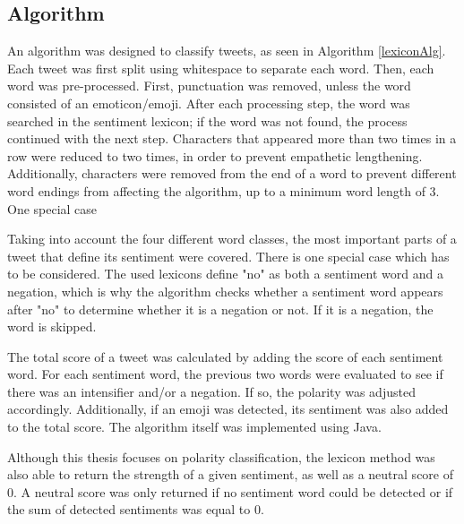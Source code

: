 \subsection{Algorithm}

An algorithm was designed to classify tweets, as seen in Algorithm \ref{lexiconAlg}. Each tweet was first split using whitespace to separate each word. Then, each word was pre-processed. First, punctuation was removed, unless the word consisted of an emoticon/emoji. After each processing step, the word was searched in the sentiment lexicon; if the word was not found, the process continued with the next step. Characters that appeared more than two times in a row were reduced to two times, in order to prevent empathetic lengthening. Additionally, characters were removed from the end of a word to prevent different word endings from affecting the algorithm, up to a minimum word length of 3. One special case

Taking into account the four different word classes, the most important parts of a tweet that define its sentiment were covered. There is one special case which has to be considered. The used lexicons define "no" as both a sentiment word and a negation, which is why the algorithm checks whether a sentiment word appears after "no" to determine whether it is a negation or not. If it is a negation, the word is skipped.

The total score of a tweet was calculated by adding the score of each sentiment word. For each sentiment word, the previous two words were evaluated to see if there was an intensifier and/or a negation. If so, the polarity was adjusted accordingly. Additionally, if an emoji was detected, its sentiment was also added to the total score. The algorithm itself was implemented using Java.

Although this thesis focuses on polarity classification, the lexicon method was also able to return the strength of a given sentiment, as well as a neutral score of 0. A neutral score was only returned if no sentiment word could be detected or if the sum of detected sentiments was equal to 0.


